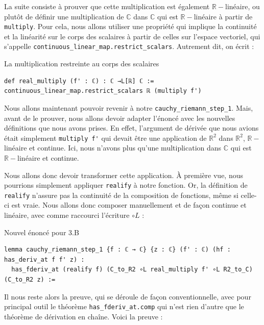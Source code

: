 \documentclass[a4paper, 11pt, twoside]{report}
\newcommand\R{\mathbb{R}}
\newcommand\C{\mathbb{C}}
\begin{document}
La suite consiste à prouver que cette multiplication est également $\R-$linéaire, ou plutôt de définir une multiplication de $\C$ dans $\C$ qui est $\R-$linéaire à partir de \verb|multiply|. Pour cela, nous allons utiliser une propriété qui implique la continuité et la linéarité sur le corps des scalaires à partir de celles sur l'espace vectoriel, qui s'appelle \verb|continuous_linear_map.restrict_scalars|. Autrement dit, on écrit :

\begin{code}{La multiplication restreinte au corps des scalaires}
\begin{lstlisting}
def real_multiply (f' : ℂ) : ℂ →L[ℝ] ℂ :=
continuous_linear_map.restrict_scalars ℝ (multiply f')
\end{lstlisting}
\end{code}

\bigskip

Nous allons maintenant pouvoir revenir à notre \verb|cauchy_riemann_step_1|. Mais, avant de le prouver, nous allons devoir adapter l'énoncé avec les nouvelles définitions que nous avons prises. En effet, l'argument de dérivée que nous avions était simplement \verb|multiply f'| qui devait être une application de $\R^2$ dans $\R^2$, $\R-$linéaire et continue. Ici, nous n'avons plus qu'une multiplication dans $\C$ qui est $\R-$linéaire et continue.

Nous allons donc devoir transformer cette application. À première vue, nous pourrions simplement appliquer \verb|realify| à notre fonction. Or, la définition de \verb|realify| n'assure pas la continuité de la composition de fonctions, même si celle-ci est vraie. Nous allons donc composer manuellement et de façon continue et linéaire, avec comme raccourci l'écriture $\circ L$ :

\begin{code}{Nouvel énoncé pour 3.B}
\begin{lstlisting}
lemma cauchy_riemann_step_1 {f : ℂ → ℂ} {z : ℂ} (f' : ℂ) (hf : has_deriv_at f f' z) : 
  has_fderiv_at (realify f) (C_to_R2 ∘L real_multiply f' ∘L R2_to_C) (C_to_R2 z) := 
\end{lstlisting}
\end{code}

Il nous reste alors la preuve, qui se déroule de façon conventionnelle, avec pour principal outil le théorème \verb|has_fderiv_at.comp| qui n'est rien d'autre que le théorème de dérivation en chaîne. Voici la preuve :
\end{document}
